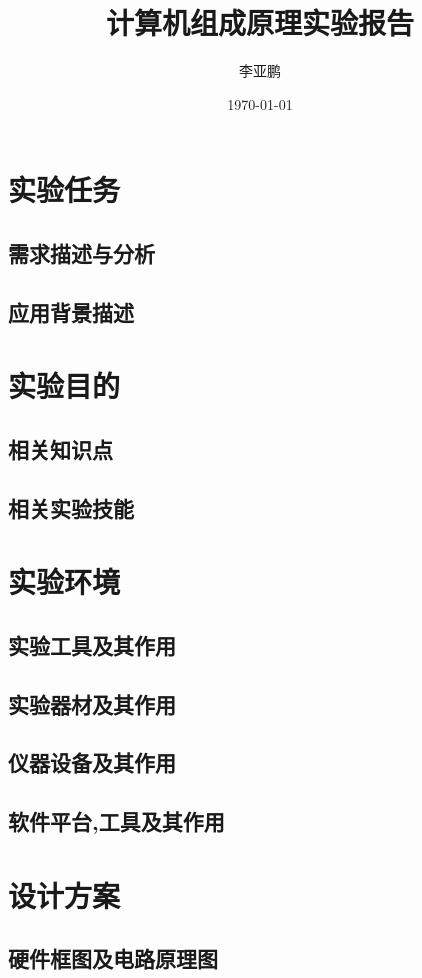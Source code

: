 \documentclass[UTF8]{ctexart}
\title{计算机组成原理实验报告}
\author{李亚鹏}
\date{\today}
\begin{document}
\maketitle
\tableofcontents
\newpage
\section{实验任务}
\subsection{需求描述与分析}
\subsection{应用背景描述}
\section{实验目的}
\subsection{相关知识点}
\subsection{相关实验技能}
\section{实验环境}
\subsection{实验工具及其作用}
\subsection{实验器材及其作用}
\subsection{仪器设备及其作用}
\subsection{软件平台,工具及其作用}
\section{设计方案}
\subsection{硬件框图及电路原理图}
\end{document}
